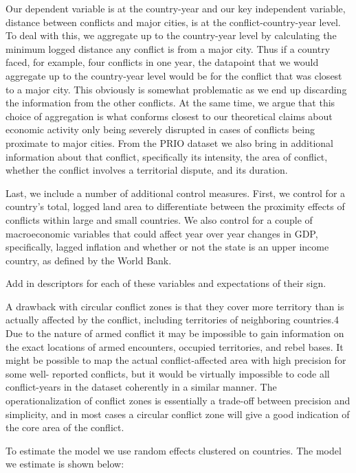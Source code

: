 Our dependent variable is at the country-year and our key independent variable, distance between conflicts and major cities, is at the conflict-country-year level. To deal with this, we aggregate up to the country-year level by calculating the minimum logged distance any conflict is from a major city. Thus if a country faced, for example, four conflicts in one year, the datapoint that we would aggregate up to the country-year level would be for the conflict that was closest to a major city. This obviously is somewhat problematic as we end up discarding the information from the other conflicts. At the same time, we argue that this choice of aggregation is what conforms closest to our theoretical claims about economic activity only being severely disrupted in cases of conflicts being proximate to major cities. From the PRIO dataset we also bring in additional information about that conflict, specifically its intensity, the area of conflict, whether the conflict involves a territorial dispute, and its duration.

Last, we include a number of additional control measures. First, we control for a country's total, logged land area to differentiate between the proximity effects of conflicts within large and small countries. We also control for a couple of macroeconomic variables that could affect year over year changes in GDP, specifically, lagged inflation and whether or not the state is an upper income country, as defined by the World Bank.

Add in descriptors for each of these variables and expectations of their sign.

A drawback with circular conflict zones is that they cover more territory than is actually affected by the conflict, including territories of neighboring countries.4 Due to the nature of armed conflict it may be impossible to gain information on the exact locations of armed encounters, occupied territories, and rebel bases. It might be possible to map the actual conflict-affected area with high precision for some well- reported conflicts, but it would be virtually impossible to code all conflict-years in the dataset coherently in a similar manner. The operationalization of conflict zones is essentially a trade-off between precision and simplicity, and in most cases a circular conflict zone will give a good indication of the core area of the conflict.

To estimate the model we use random effects clustered on countries. The model we estimate is shown below:


